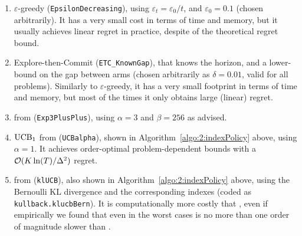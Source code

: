 \begin{enumerate}
    \item
    $\varepsilon$-greedy \cite{Bubeck12} (\texttt{EpsilonDecreasing}),
    using $\varepsilon_t = \varepsilon_0 / t$, and $\varepsilon_0 = 0.1$ (chosen arbitrarily).
    It has a very small cost in terms of time and memory, but it usually achieves linear regret in practice, despite of the theoretical regret bound.

    \item
    Explore-then-Commit (\texttt{ETC\_KnownGap}),
    that knows the horizon, and a lower-bound on the gap between arms (chosen arbitrarily as $\delta=0.01$, valid for all problems).
    Similarly to $\varepsilon$-greedy, it has a very small footprint in terms of time and memory, but most of the times it only obtains large (linear) regret.

    \item
    \Exppp{} from \cite{Seldin17} (\texttt{Exp3PlusPlus}), using $\alpha=3$ and $\beta=256$ as advised.

    \item
    $\mathrm{UCB}_1$ from \cite{Auer02} (\texttt{UCBalpha}), shown in Algorithm~\ref{algo:2:indexPolicy} above, using $\alpha=1$.
    It achieves order-optimal problem-dependent bounds with a $\mathcal{O}(K\ln(T)/\Delta^2)$ regret.

    \item
    \klUCB{} from \cite{KLUCBJournal} (\texttt{klUCB}), also shown in Algorithm~\ref{algo:2:indexPolicy} above, using the Bernoulli KL divergence and the corresponding \klUCB{} indexes (coded as \texttt{kullback.klucbBern}).
    It is computationally more costly that \UCB,
    even if empirically we found that even in the worst cases \klUCB{} is no more than one order of magnitude slower than \UCB.


\end{enumerate}
